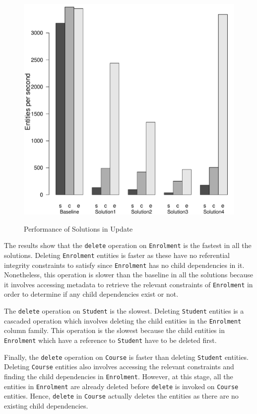 \begin{figure}[H]
		{\includegraphics[width=\W]{figure/result/barplot-delete-tp.pdf} \label{fres:delete-}\label{fres:Delete-throughput}}
		\caption{Performance of Solutions in Update}\label{fres:Delete}
	\end{figure}
 
The results show that the \texttt{delete} operation on \texttt{Enrolment}
is the fastest in all the solutions. Deleting \texttt{Enrolment} entities is
faster as these have no referential integrity constraints to satisfy since
\texttt{Enrolment} has no child dependencies in it.
Nonetheless, this operation is  slower than the baseline in all the solutions
because it involves accessing metadata to retrieve the relevant constraints of
\texttt{Enrolment} in order to determine if any child dependencies exist or
not.

The \texttt{delete} operation on \texttt{Student} is the slowest. Deleting
\texttt{Student} entities is a cascaded operation which involves deleting the
child entities in the \texttt{Enrolment} column family. This operation is the
slowest because  the  child entities in \texttt{Enrolment}  which have a
reference to  \texttt{Student} have to be deleted first.

Finally, the \texttt{delete} operation on \texttt{Course} is faster than
deleting \texttt{Student} entities. Deleting \texttt{Course} entities also
involves accessing the relevant constraints and finding the child dependencies
in \texttt{Enrolment}. However, at this stage,  all the entities in
\texttt{Enrolment} are already deleted before \texttt{delete} is invoked on
\texttt{Course} entities. Hence, \texttt{delete} in \texttt{Course} actually
deletes the entities as there are no existing child dependencies.

